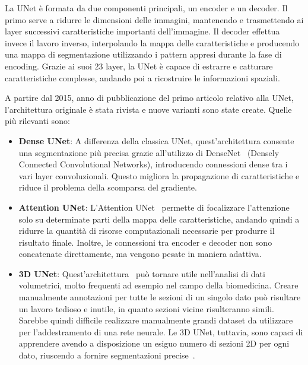 \documentclass[12pt]{report}
\begin{document}
La UNet è formata da due componenti principali, un encoder e un decoder. Il primo serve a ridurre le dimensioni delle immagini, mantenendo e trasmettendo ai layer successivi caratteristiche importanti dell'immagine. Il decoder effettua invece il lavoro inverso, interpolando la mappa delle caratteristiche e producendo una mappa di segmentazione utilizzando i pattern appresi durante la fase di encoding. Grazie ai suoi 23 layer, la UNet è capace di estrarre e catturare caratteristiche complesse, andando poi a ricostruire le informazioni spaziali.

A partire dal 2015, anno di pubblicazione del primo articolo relativo alla UNet, l'architettura originale è stata rivista e nuove varianti sono state create. Quelle più rilevanti sono:

\begin{itemize}
	\item \textbf{Dense UNet}: A differenza della classica UNet, quest'architettura consente una segmentazione più precisa grazie all'utilizzo di DenseNet~\cite{8296389} (Densely Connected Convolutional Networks), introducendo connessioni dense tra i vari layer convoluzionali. Questo migliora la propagazione di caratteristiche e riduce il problema della scomparsa del gradiente.
	
	\item \textbf{Attention UNet}: L'Attention UNet~\cite{oktay2018attentionunetlearninglook} permette di focalizzare l'attenzione solo su determinate parti della mappa delle caratteristiche, andando quindi a ridurre la quantità di risorse computazionali necessarie per produrre il risultato finale. Inoltre, le connessioni tra encoder e decoder non sono concatenate direttamente, ma vengono pesate in maniera adattiva.
	
	\item \textbf{3D UNet}: Quest'architettura~\cite{çiçek20163dunetlearningdense} può tornare utile nell'analisi di dati volumetrici, molto frequenti ad esempio nel campo della biomedicina. Creare manualmente annotazioni per tutte le sezioni di un singolo dato può risultare un lavoro tedioso e inutile, in quanto sezioni vicine risulteranno simili. Sarebbe quindi difficile realizzare manualmente grandi dataset da utilizzare per l'addestramento di una rete neurale. Le 3D UNet, tuttavia, sono capaci di apprendere avendo a disposizione un esiguo numero di sezioni 2D per ogni dato, riuscendo a fornire segmentazioni precise~\cite{çiçek20163dunetlearningdense}.
\end{itemize}
\end{document}

